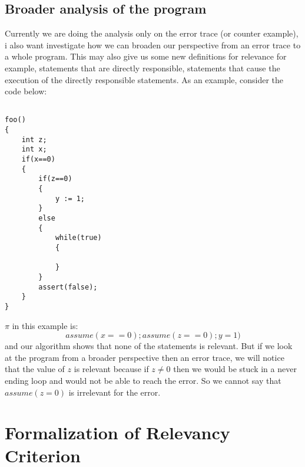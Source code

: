 \documentclass{article}
\begin{document}
\subsection{Broader analysis of the program}
Currently we are doing the analysis only on the error trace (or counter example), i also want investigate how we can broaden our perspective from an error trace to a whole program. This may also give us some new definitions for relevance for example, statements that are directly responsible, statements that cause the execution of the directly responsible statements. As an example, consider the code below:\\
\begin{lstlisting}

foo()
{
	int z;
	int x;
	if(x==0)
	{
		if(z==0)
		{
			y := 1;
		}
		else
		{
			while(true)
			{
				
			}
		}		
		assert(false);
	}	
}

\end{lstlisting}
$\pi$ in this example is:
$$ assume(x==0); assume(z==0); y=1) $$
and our algorithm shows that none of the statements is relevant. But if we look at the program from a broader perspective then an error trace, we will notice that the value of  $z$ is relevant because if $z \neq 0$ then we would be stuck in a never ending loop and would not be able to reach the error.  
So we cannot say that $assume(z=0)$ is irrelevant for the error.
\newpage
\section{Formalization of Relevancy Criterion}
\end{document}
